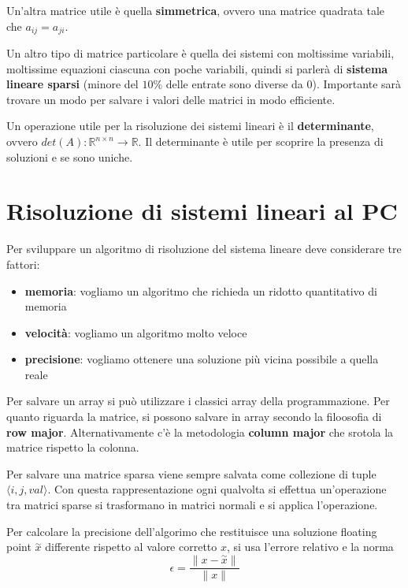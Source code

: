 Un'altra matrice utile è quella \textbf{simmetrica}, ovvero una matrice quadrata
tale che $a_{ij } = a_{ji}$.

Un altro tipo di matrice particolare è quella dei sistemi con moltissime variabili,
moltissime equazioni ciascuna con poche variabili, quindi si parlerà di \textbf{sistema 
lineare sparsi} (minore del $10\%$ delle entrate sono diverse da $0$). Importante sarà 
trovare un modo per salvare i valori delle matrici in modo efficiente. 

Un operazione utile per la risoluzione dei sistemi lineari è il \textbf{determinante},
ovvero $det(A): \mathbb{R}^{n\times n} \rightarrow \mathbb{R}$. Il determinante
è utile per scoprire la presenza di soluzioni e se sono uniche.

\section{Risoluzione di sistemi lineari al PC}
Per sviluppare un algoritmo di risoluzione del sistema lineare deve considerare 
tre fattori:
\begin{itemize}
    \item \textbf{memoria}: vogliamo un algoritmo che richieda un ridotto quantitativo 
    di memoria
    \item \textbf{velocità}: vogliamo un algoritmo molto veloce
    \item \textbf{precisione}: vogliamo ottenere una soluzione più vicina possibile
    a quella reale
\end{itemize}

Per salvare un array si può utilizzare i classici array della programmazione. Per 
quanto riguarda la matrice, si possono salvare in array secondo la filoosofia 
di \textbf{row major}. Alternativamente c'è la metodologia \textbf{column major}
che srotola la matrice rispetto la colonna.

Per salvare una matrice sparsa viene sempre salvata come collezione di tuple $\langle i,j,val\rangle$.
Con questa rappresentazione ogni qualvolta si effettua un'operazione tra matrici
sparse si trasformano in matrici normali e si applica l'operazione.

Per calcolare la precisione dell'algorimo che restituisce una soluzione floating 
point $\stackrel{\sim}{x}$ differente rispetto al valore corretto $x$, si usa 
l'errore relativo e la norma
\begin{equation*}
    \epsilon = \frac{\|x-\stackrel{\sim}{x}\|}{\|x\|}
\end{equation*}


